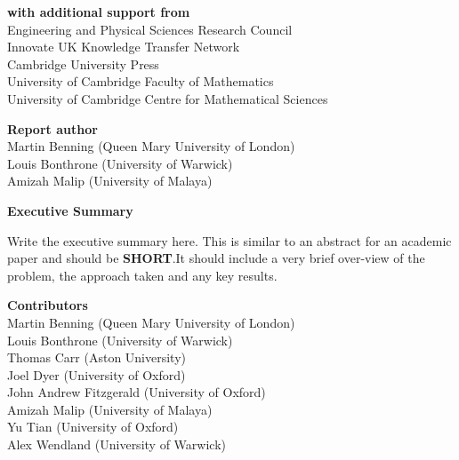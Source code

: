 \documentclass[12pt]{article}
\begin{document}
\begin{center}
\textbf{with additional support from}\\
Engineering and Physical Sciences Research Council\\
Innovate UK Knowledge Transfer Network\\
Cambridge University Press\\
University of Cambridge Faculty of Mathematics\\
University of Cambridge Centre for Mathematical Sciences
\end{center}
\newpage
\begin{center}
    \large\textbf{Report author}\\ %
   \vskip1cm
    \normalsize Martin Benning (Queen Mary University of London) \\
    \normalsize Louis Bonthrone (University of Warwick)\\
    \normalsize Amizah Malip (University of Malaya)\\
\end{center}
\vskip2cm
\begin{center}
    \textbf{Executive Summary}
\end{center}
Write the executive summary here. This is similar to an abstract for an academic paper and should be \textbf{SHORT}.It should include a very brief over-view of the problem, the approach taken and any key results.
\newpage
\begin{center}
    \large\textbf{Contributors}\\
    \vskip1cm
    \normalsize Martin Benning (Queen Mary University of London)\\
    \normalsize Louis Bonthrone (University of Warwick)\\
    \normalsize Thomas Carr (Aston University)\\
    \normalsize Joel Dyer (University of Oxford)\\
    \normalsize John Andrew Fitzgerald (University of Oxford)\\
    \normalsize Amizah Malip (University of Malaya)\\
    \normalsize Yu Tian (University of Oxford)\\
    \normalsize Alex Wendland (University of Warwick)
\end{center}
\newpage
\end{document}

